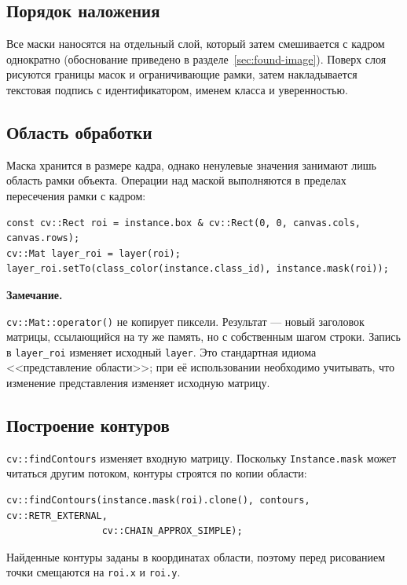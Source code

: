 \documentclass[11pt,a4paper]{article}
\theoremstyle{definition}
\theoremstyle{remark}
\newenvironment{note}
  {\par\medskip\noindent
   \begin{lrbox}{\notebox}%
   \begin{minipage}{0.93\linewidth}%
   \small\textbf{Замечание.}\par\vspace{1pt}\noindent\ignorespaces}
  {\end{minipage}%
   \end{lrbox}%
   \fboxsep=6pt\relax
   \colorbox{codebg}{\usebox{\notebox}}%
   \par\medskip}
\begin{document}
\subsection{Порядок наложения}

Все маски наносятся на отдельный слой, который затем смешивается с кадром
однократно (обоснование приведено в разделе~\ref{sec:found-image}). Поверх
слоя рисуются границы масок и ограничивающие рамки, затем накладывается
текстовая подпись с идентификатором, именем класса и уверенностью.

\subsection{Область обработки}

Маска хранится в размере кадра, однако ненулевые значения занимают лишь
область рамки объекта. Операции над маской выполняются в пределах
пересечения рамки с кадром:

\begin{lstlisting}
const cv::Rect roi = instance.box & cv::Rect(0, 0, canvas.cols, canvas.rows);
cv::Mat layer_roi = layer(roi);
layer_roi.setTo(class_color(instance.class_id), instance.mask(roi));
\end{lstlisting}

\begin{note}
\texttt{cv::Mat::operator()} не копирует пиксели. Результат --- новый заголовок
матрицы, ссылающийся на ту же память, но с собственным шагом строки. Запись в
\texttt{layer\_roi} изменяет исходный \texttt{layer}. Это стандартная идиома
<<представление области>>; при её использовании необходимо учитывать, что
изменение представления изменяет исходную матрицу.
\end{note}

\subsection{Построение контуров}

\texttt{cv::findContours} изменяет входную матрицу. Поскольку
\texttt{Instance.mask} может читаться другим потоком, контуры строятся по
копии области:

\begin{lstlisting}
cv::findContours(instance.mask(roi).clone(), contours, cv::RETR_EXTERNAL,
                 cv::CHAIN_APPROX_SIMPLE);
\end{lstlisting}

Найденные контуры заданы в координатах области, поэтому перед рисованием
точки смещаются на \texttt{roi.x} и \texttt{roi.y}.
\end{document}
